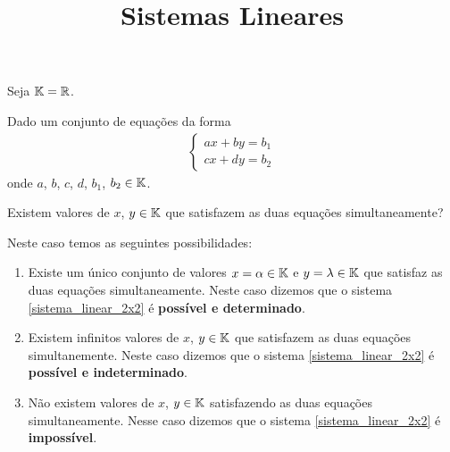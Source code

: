 \documentclass{beamer}
\title{Sistemas Lineares}
\author[\autor]{\autor}
\institute[\instituto]{\instituto}
\date{}
\begin{document}
    \begin{frame}
        \maketitle
    \end{frame}


    \begin{frame}
        Seja $\mathbb{K} = \mathbb{R}$.\pause

        \vspace{.3cm}
        
        Dado um conjunto de equações da forma
        \begin{align}
            \begin{cases}\label{sistema_linear_2x2}
                ax + by = b_1\\
                cx + dy = b_2
            \end{cases}
        \end{align}
        onde $a$, $b$, $c$, $d$, $b_1$, $b_2 \in \mathbb{K}$.\pause
    
        \vspace{.3cm}

        Existem valores de $x$, $y \in \mathbb{K}$ que satisfazem as duas equações simultaneamente?
    \end{frame}
    
    \begin{frame}
        Neste caso temos as seguintes possibilidades:\pause
        \begin{enumerate}[label={\roman*})]
            \item Existe um único conjunto de valores $x = \alpha \in \mathbb{K}$ e $y = \lambda \in \mathbb{K}$ \pause que satisfaz as duas equações simultaneamente. \pause Neste caso dizemos que o sistema \eqref{sistema_linear_2x2} \pause é \textbf{possível e determinado}.\pause

            \item Existem infinitos valores de $x$, $y \in \mathbb{K}$ \pause que satisfazem as duas equações simultanemente. \pause Neste caso dizemos que o sistema \eqref{sistema_linear_2x2} \pause é \textbf{possível e indeterminado}.\pause

            \item Não existem valores de $x$, $y \in \mathbb{K}$ \pause satisfazendo as duas equações simultaneamente. \pause Nesse caso dizemos que o sistema \eqref{sistema_linear_2x2} \pause é \textbf{impossível}.
        \end{enumerate}
    \end{frame}
    
\end{document}
